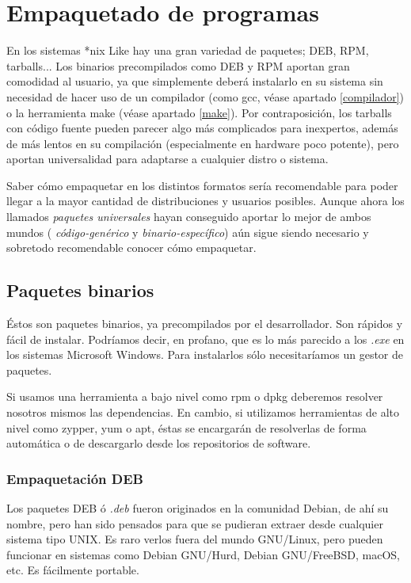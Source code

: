 \documentclass[a4paper, 11pt, titlepage]{article}
\begin{document}
\section{Empaquetado de programas}

    En los sistemas *nix Like hay una gran variedad de paquetes; DEB, RPM, tarballs...
    Los binarios precompilados como DEB y RPM aportan gran comodidad al usuario, ya que simplemente 
    deberá instalarlo en su sistema sin necesidad de hacer uso de un compilador (como gcc, véase 
    apartado \ref{compilador}) o la herramienta make (véase apartado \ref{make}). Por 
    contraposición, los tarballs con código fuente pueden parecer algo más complicados 
    para inexpertos, además de más lentos en su compilación (especialmente en hardware poco 
    potente), pero aportan universalidad para adaptarse a cualquier distro o sistema.

    Saber cómo empaquetar en los distintos formatos sería recomendable para poder llegar 
    a la mayor cantidad de distribuciones y usuarios posibles. Aunque ahora los llamados 
    \textit{paquetes universales} hayan conseguido aportar lo mejor de ambos mundos (
    \textit{código-genérico} y \textit{binario-específico}) aún sigue siendo necesario y 
    sobretodo recomendable conocer cómo empaquetar.

    \subsection{Paquetes binarios}

        Éstos son paquetes binarios, ya precompilados por el desarrollador. Son rápidos y 
        fácil de instalar. Podríamos decir, en profano, que es lo más parecido a los \textit{.exe}
        en los sistemas Microsoft Windows. Para instalarlos sólo necesitaríamos un gestor 
        de paquetes.

        Si usamos una herramienta a bajo nivel como rpm o dpkg deberemos resolver nosotros mismos 
        las dependencias. En cambio, si utilizamos herramientas de alto nivel como zypper, yum o apt,
        éstas se encargarán de resolverlas de forma automática o de descargarlo desde los repositorios 
        de software.

        \subsubsection{Empaquetación DEB}

            Los paquetes DEB ó \textit{.deb} fueron originados en la comunidad Debian, de ahí su nombre, 
            pero han sido pensados para que se pudieran extraer desde cualquier sistema tipo UNIX. Es raro 
            verlos fuera del mundo GNU/Linux, pero pueden funcionar en sistemas como Debian GNU/Hurd, 
            Debian GNU/FreeBSD, macOS, etc. Es fácilmente portable.
\end{document}
